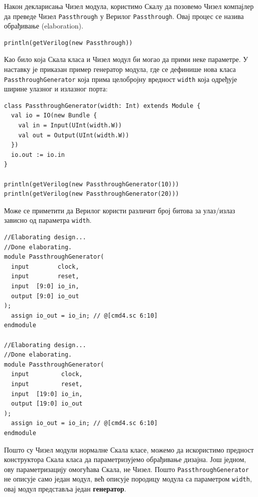 \documentclass[12pt, a4paper]{article}
\theoremstyle{definition}
\begin{document}
Након декларисања Чизел модула, користимо Скалу да позовемо Чизел компајлер да преведе Чизел \verb+Passthrough+ у Верилог \verb+Passthrough+. Овај процес се назива обрађивање (elaboration).
\begin{verbatim}
println(getVerilog(new Passthrough))
\end{verbatim}

Као било која Скала класа и Чизел модул би могао да прими неке параметре. У наставку је приказан пример генератор модула, где се дефинише нова класа \verb+PassthroughGenerator+ која прима целобројну вредност \verb+width+ која одређује ширине улазног и излазног порта:
\begin{verbatim}
class PassthroughGenerator(width: Int) extends Module {
  val io = IO(new Bundle {
    val in = Input(UInt(width.W))
    val out = Output(UInt(width.W))
  })
  io.out := io.in
}

println(getVerilog(new PassthroughGenerator(10)))
println(getVerilog(new PassthroughGenerator(20)))
\end{verbatim}
Може се приметити да Верилог користи различит број битова за улаз/излаз зависно од параметра \verb+width+.
\begin{verbatim}
//Elaborating design...
//Done elaborating.
module PassthroughGenerator(
  input        clock,
  input        reset,
  input  [9:0] io_in,
  output [9:0] io_out
);
  assign io_out = io_in; // @[cmd4.sc 6:10]
endmodule

//Elaborating design...
//Done elaborating.
module PassthroughGenerator(
  input         clock,
  input         reset,
  input  [19:0] io_in,
  output [19:0] io_out
);
  assign io_out = io_in; // @[cmd4.sc 6:10]
endmodule
\end{verbatim}
Пошто су Чизел модули нормалне Скала класе, можемо да искористимо предност конструктора Скала класа да параметризујемо обрађивање дизајна. Још једном, ову параметризацију омогућава Скала, не Чизел. Пошто \verb+PassthroughGenerator+ не описује само један модул, већ описује породицу модула са параметром \verb+width+, овај модул представља један \textbf{генератор}.
\end{document}
